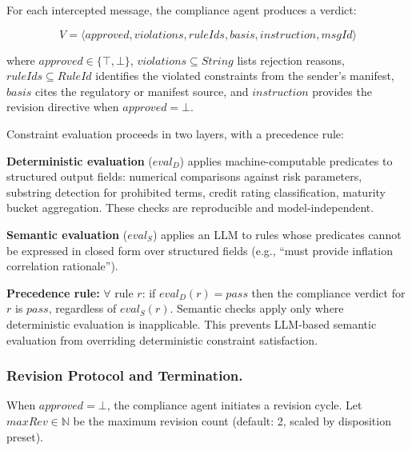 \documentclass[runningheads]{llncs}
\begin{document}
For each intercepted message, the compliance agent produces a verdict:

\begin{equation}
V = \langle \mathit{approved}, \mathit{violations},
    \mathit{ruleIds}, \mathit{basis}, \mathit{instruction},
    \mathit{msgId} \rangle
\end{equation}

\noindent where $\mathit{approved} \in \{\top, \bot\}$,
$\mathit{violations} \subseteq \mathit{String}$ lists rejection reasons,
$\mathit{ruleIds} \subseteq \mathit{RuleId}$ identifies the violated
constraints from the sender's manifest, $\mathit{basis}$ cites the
regulatory or manifest source, and $\mathit{instruction}$ provides the
revision directive when $\mathit{approved} = \bot$.

Constraint evaluation proceeds in two layers, with a precedence rule:

\textbf{Deterministic evaluation} ($\mathit{eval}_D$) applies
machine-computable predicates to structured output fields: numerical
comparisons against risk parameters, substring detection for prohibited
terms, credit rating classification, maturity bucket aggregation. These
checks are reproducible and model-independent.

\textbf{Semantic evaluation} ($\mathit{eval}_S$) applies an LLM to rules
whose predicates cannot be expressed in closed form over structured
fields (e.g., ``must provide inflation correlation rationale'').

\textbf{Precedence rule:} $\forall$ rule $r$: if
$\mathit{eval}_D(r) = \mathit{pass}$ then the compliance verdict for $r$
is $\mathit{pass}$, regardless of $\mathit{eval}_S(r)$. Semantic checks
apply only where deterministic evaluation is inapplicable. This prevents
LLM-based semantic evaluation from overriding deterministic constraint
satisfaction.

\subsubsection{Revision Protocol and Termination.}

When $\mathit{approved} = \bot$, the compliance agent initiates a
revision cycle. Let $\mathit{maxRev} \in \mathbb{N}$ be the maximum
revision count (default: 2, scaled by disposition preset).
\end{document}
